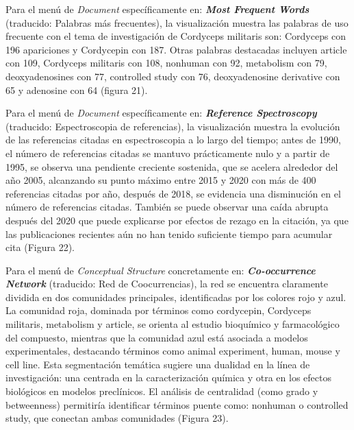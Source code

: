 \documentclass[
  spanish,
  letterpaper,
  DIV=11,
  numbers=noendperiod]{scrreprt}
\begin{document}
Para el menú de \emph{Document} específicamente en: \textbf{\emph{Most
Frequent Words}} (traducido: Palabras más frecuentes), la visualización
muestra las palabras de uso frecuente con el tema de investigación de
Cordyceps militaris son: Cordyceps con 196 apariciones y Cordycepin con
187. Otras palabras destacadas incluyen article con 109, Cordyceps
militaris con 108, nonhuman con 92, metabolism con 79, deoxyadenosines
con 77, controlled study con 76, deoxyadenosine derivative con 65 y
adenosine con 64 (figura 21).

Para el menú de \emph{Document} específicamente en:
\textbf{\emph{Reference Spectroscopy}} (traducido: Espectroscopia de
referencias), la visualización muestra la evolución de las referencias
citadas en espectroscopia a lo largo del tiempo; antes de 1990, el
número de referencias citadas se mantuvo prácticamente nulo y a partir
de 1995, se observa una pendiente creciente sostenida, que se acelera
alrededor del año 2005, alcanzando su punto máximo entre 2015 y 2020 con
más de 400 referencias citadas por año, después de 2018, se evidencia
una disminución en el número de referencias citadas. También se puede
observar una caída abrupta después del 2020 que puede explicarse por
efectos de rezago en la citación, ya que las publicaciones recientes aún
no han tenido suficiente tiempo para acumular cita (Figura 22).

Para el menú de \emph{Conceptual Structure} concretamente en:
\textbf{\emph{Co-occurrence Network}} (traducido: Red de Coocurrencias),
la red se encuentra claramente dividida en dos comunidades principales,
identificadas por los colores rojo y azul. La comunidad roja, dominada
por términos como cordycepin, Cordyceps militaris, metabolism y article,
se orienta al estudio bioquímico y farmacológico del compuesto, mientras
que la comunidad azul está asociada a modelos experimentales, destacando
términos como animal experiment, human, mouse y cell line. Esta
segmentación temática sugiere una dualidad en la línea de investigación:
una centrada en la caracterización química y otra en los efectos
biológicos en modelos preclínicos. El análisis de centralidad (como
grado y betweenness) permitiría identificar términos puente como:
nonhuman o controlled study, que conectan ambas comunidades (Figura 23).
\end{document}
